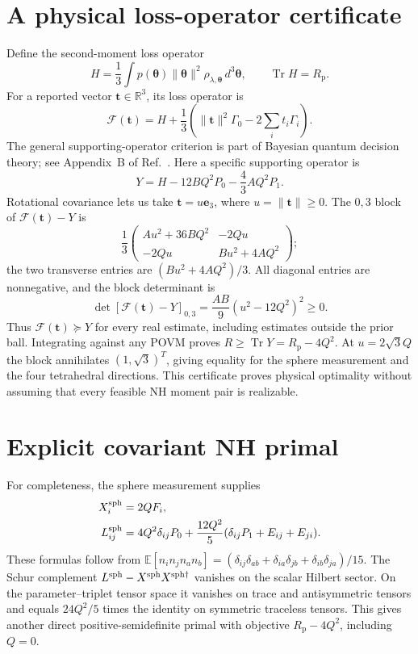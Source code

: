 \documentclass[aps,pra,reprint,amsmath,amssymb,nofootinbib,longbibliography,floatfix]{revtex4-2}
\newcommand{\Tr}{\operatorname{Tr}}
\newcommand{\thv}{\bm{\theta}}
\begin{document}
\section{A physical loss-operator certificate}\label{app:physical}
Define the second-moment loss operator
\begin{equation}
 H=\frac13\int p(\thv)\|\thv\|^2\rho_{\lambda,\thv}\,d^3\thv,
 \qquad\Tr H=R_{\mathrm p}.
\end{equation}
For a reported vector $\bm t\in\mathbb R^3$, its loss operator is
\begin{equation}
 \mathcal F(\bm t)=H+\frac13\left(\|\bm t\|^2\Gamma_0
                                 -2\sum_it_i\Gamma_i\right).
\end{equation}
The general supporting-operator criterion is part of Bayesian quantum
decision theory; see Appendix~B of Ref.~\cite{Albarelli2026}. Here a
specific supporting operator is
\begin{equation}
 Y=H-12BQ^2P_0-\frac43AQ^2P_1.
\end{equation}
Rotational covariance lets us take $\bm t=u\bm e_3$, where
$u=\|\bm t\|\geq0$. The $0,3$ block of $\mathcal F(\bm t)-Y$ is
\begin{equation}
 \frac13\begin{pmatrix}
 Au^2+36BQ^2&-2Qu\\-2Qu&Bu^2+4AQ^2
 \end{pmatrix};
\end{equation}
the two transverse entries are $(Bu^2+4AQ^2)/3$. All diagonal entries
are nonnegative, and the block determinant is
\begin{equation}
 \det[\mathcal F(\bm t)-Y]_{0,3}
             =\frac{AB}{9}(u^2-12Q^2)^2\geq0.
\end{equation}
Thus $\mathcal F(\bm t)\succeq Y$ for every real estimate, including
estimates outside the prior ball. Integrating against any POVM proves
$R\geq\Tr Y=R_{\mathrm p}-4Q^2$. At $u=2\sqrt3Q$ the block annihilates
$(1,\sqrt3)^T$, giving equality for the sphere measurement and the
four tetrahedral directions. This certificate proves physical
optimality without assuming that every feasible NH moment pair is
realizable.

\section{Explicit covariant NH primal}\label{app:primal}
For completeness, the sphere measurement supplies
\begin{align}
 X_i^{\rm sph}&=2QF_i,\nonumber\\
 L_{ij}^{\rm sph}&=4Q^2\delta_{ij}P_0
       +\frac{12Q^2}{5}(\delta_{ij}P_1+E_{ij}+E_{ji}).
\end{align}
These formulas follow from
$\mathbb E[n_in_jn_an_b]=(\delta_{ij}\delta_{ab}+
\delta_{ia}\delta_{jb}+\delta_{ib}\delta_{ja})/15$.
The Schur complement $L^{\rm sph}-X^{\rm sph}X^{\rm sph\dagger}$
vanishes on the scalar Hilbert sector. On the parameter--triplet
tensor space it vanishes on trace and antisymmetric tensors and
equals $24Q^2/5$ times the identity on symmetric traceless tensors.
This gives another direct positive-semidefinite primal with objective
$R_{\mathrm p}-4Q^2$, including $Q=0$.



\end{document}
